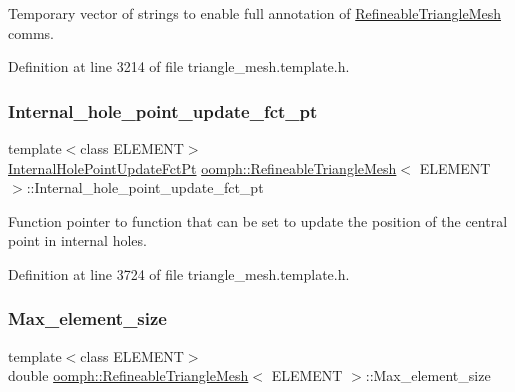 Temporary vector of strings to enable full annotation of \hyperlink{classoomph_1_1RefineableTriangleMesh}{Refineable\+Triangle\+Mesh} comms. 



Definition at line 3214 of file triangle\+\_\+mesh.\+template.\+h.

\mbox{\label{classoomph_1_1RefineableTriangleMesh_a64228789345c2ef62942f66058c96a5e}} 
\subsubsection{\texorpdfstring{Internal\+\_\+hole\+\_\+point\+\_\+update\+\_\+fct\+\_\+pt}{Internal\_hole\_point\_update\_fct\_pt}}
{\footnotesize\ttfamily template$<$class E\+L\+E\+M\+E\+NT$>$ \\
\hyperlink{classoomph_1_1RefineableTriangleMesh_aa6831f42aa1941f4ae0b9186d01f9d7c}{Internal\+Hole\+Point\+Update\+Fct\+Pt} \hyperlink{classoomph_1_1RefineableTriangleMesh}{oomph\+::\+Refineable\+Triangle\+Mesh}$<$ E\+L\+E\+M\+E\+NT $>$\+::Internal\+\_\+hole\+\_\+point\+\_\+update\+\_\+fct\+\_\+pt\hspace{0.3cm}{\ttfamily [protected]}}



Function pointer to function that can be set to update the position of the central point in internal holes. 



Definition at line 3724 of file triangle\+\_\+mesh.\+template.\+h.

\mbox{\label{classoomph_1_1RefineableTriangleMesh_a35205d1ccdc32f0242f75941162f982e}} 
\subsubsection{\texorpdfstring{Max\+\_\+element\+\_\+size}{Max\_element\_size}}
{\footnotesize\ttfamily template$<$class E\+L\+E\+M\+E\+NT$>$ \\
double \hyperlink{classoomph_1_1RefineableTriangleMesh}{oomph\+::\+Refineable\+Triangle\+Mesh}$<$ E\+L\+E\+M\+E\+NT $>$\+::Max\+\_\+element\+\_\+size\hspace{0.3cm}{\ttfamily [protected]}}



